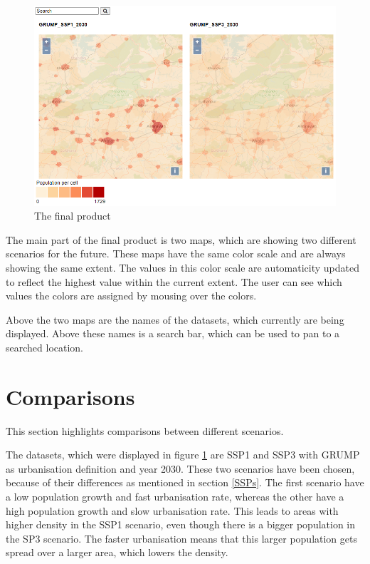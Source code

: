 \begin{figure} [H]
	\centering
	\includegraphics[width=.8\textwidth]{Pictures/FinalProduct}
	\caption{The final product}
	\label{FinalProduct}
\end{figure}

The main part of the final product is two maps, which are showing two different scenarios for the future. These maps have the same color scale and are always showing the same extent. The values in this color scale are automaticity updated to reflect the highest value within the current extent. The user can see which values the colors are assigned by mousing over the colors. 

Above the two maps are the names of the datasets, which currently are being displayed. Above these names is a search bar, which can be used to pan to a searched location.  

\section{Comparisons}\label{Comparisons}
This section highlights comparisons between different scenarios. 

The datasets, which were displayed in figure \ref{FinalProduct} are SSP1 and SSP3 with GRUMP as urbanisation definition and year 2030. These two scenarios have been chosen, because of their differences as mentioned in section \ref{SSPs}. The first scenario have a low population growth and fast urbanisation rate, whereas the other have a high population growth and slow urbanisation rate. This leads to areas with higher density in the SSP1 scenario, even though there is a bigger population in the SP3 scenario. The faster urbanisation means that this larger population gets spread over a larger area, which lowers the density.

